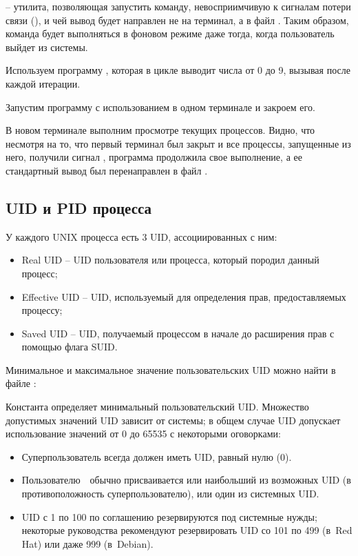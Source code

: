  -- утилита, позволяющая запустить команду, невосприимчивую к сигналам потери связи (), и чей вывод будет направлен не на терминал, а в файл . Таким образом, команда будет выполняться в фоновом режиме даже тогда, когда пользователь выйдет из системы. 

Используем программу , которая в цикле выводит числа от 0 до 9, вызывая  после каждой итерации. 



Запустим программу с использованием  в одном терминале и закроем его.



В новом терминале выполним просмотре текущих процессов. Видно, что несмотря на то, что первый терминал был закрыт и все процессы, запущенные из него, получили сигнал , программа  продолжила свое выполнение, а ее стандартный вывод был перенаправлен в файл .



\subsection{UID и PID процесса}

У каждого UNIX процесса есть 3 UID, ассоциированных с ним:

\begin{itemize}
	\item Real UID -- UID пользователя или процесса, который породил данный процесс;
	\item Effective UID -- UID, используемый для определения прав, предоставляемых процессу;
	\item Saved UID -- UID, получаемый процессом в начале до расширения прав с помощью флага SUID.
\end{itemize}

Минимальное и максимальное значение пользовательских UID можно найти в файле :


Константа  определяет минимальный пользовательский UID. Множество допустимых значений UID зависит от системы; в общем случае UID допускает использование значений от 0 до 65535 с некоторыми оговорками:

\begin{itemize}
	\item Суперпользователь всегда должен иметь UID, равный нулю (0).
	\item Пользователю  обычно присваивается или наибольший из возможных UID (в противоположность суперпользователю), или один из системных UID.
	\item UID с 1 по 100 по соглашению резервируются под системные нужды; некоторые руководства рекомендуют резервировать UID со 101 по 499 (в Red Hat) или даже 999 (в Debian).
\end{itemize}

